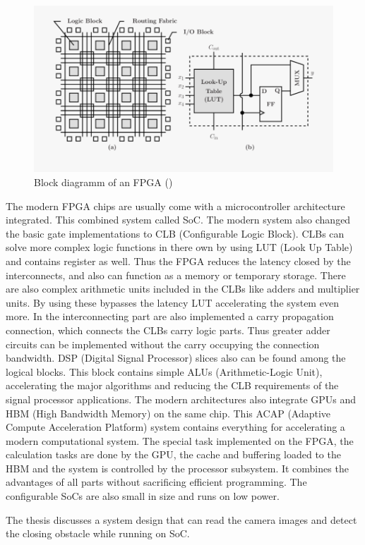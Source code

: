 \begin{figure}
    \centering
    \includegraphics[width=\linewidth]{images/fpga-block-diagram.png}
    \caption{Block diagramm of an FPGA (\cite{fpga_block})}
    \label{fig:fpga_block}
\end{figure}

The modern FPGA chips are usually come with a microcontroller architecture integrated.
This combined system called SoC.
The modern system also changed the basic gate implementations to CLB (Configurable Logic Block).
CLBs can solve more complex logic functions in there own by using LUT (Look Up Table) and contains register as well.
Thus the FPGA reduces the latency closed by the interconnects, and also can function as a memory or temporary storage.
There are also complex arithmetic units included in the CLBs like adders and multiplier units.
By using these bypasses the latency LUT accelerating the system even more.
In the interconnecting part are also implemented a carry propagation connection, which connects the CLBs carry logic parts.
Thus greater adder circuits can be implemented without the carry occupying the connection bandwidth.
DSP (Digital Signal Processor) slices also can be found among the logical blocks.
This block contains simple ALUs (Arithmetic-Logic Unit), accelerating the major algorithms and reducing the CLB requirements of the signal processor applications.
The modern architectures also integrate GPUs and HBM (High Bandwidth Memory) on the same chip.
This ACAP (Adaptive Compute Acceleration Platform) system contains everything for accelerating a modern computational system.
The special task implemented on the FPGA, the calculation tasks are done by the GPU, the cache and buffering loaded to the HBM and the system is controlled by the processor subsystem.
It combines the advantages of all parts without sacrificing efficient programming. 
The configurable SoCs are also small in size and runs on low power.

The thesis discusses a system design that can read the camera images and detect the closing obstacle while running on SoC.

\clearpage %
